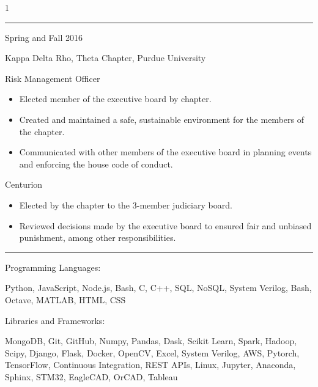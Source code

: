 \documentclass[10pt]{article}
\newlength{\cvcolumngapwidth}
\newlength{\cvleftcolumnwidth}
\newlength{\cvrightcolumnwidth}
\newcommand{\cvsectionstyle}[1]{{\normalsize\cvsectionfont\textcolor{cvsectioncolor}{#1}}}
\newcommand{\cvtitlestyle}[1]{{\large\cvtitlefont\textcolor{cvtitlecolor}{#1}}}
\newcommand{\cvdurationstyle}[1]{{\small\cvdurationfont\textcolor{cvdurationcolor}{#1}}}
\newcommand{\cvheadingstyle}[1]{{\normalsize\cvheadingfont\textcolor{cvheadingcolor}{#1}}}
\newlength{\cvafteritemskipamount}
\newlength{\cvaftersectionskipamount}
\newlength{\cvbetweensectionandheadingextraskipamount}
\newlength{\cvparskip}
\newcommand{\cvsection}[1]{
    \begin{minipage}[t]{\cvleftcolumnwidth}
        \raggedleft\cvsectionstyle{#1}
    \end{minipage}%
    \hspace{\cvcolumngapwidth}%
    \begin{minipage}[t]{\cvrightcolumnwidth}
        \textcolor{cvrulecolor}{\rule{\cvrightcolumnwidth}{0.3mm}}
    \end{minipage}

    \vspace{\cvaftersectionskipamount}
}
\newcommand{\cvitem}[2]{
    \begin{minipage}[t]{\cvleftcolumnwidth}
        \raggedleft #1
    \end{minipage}%
    \hspace{\cvcolumngapwidth}%
    \begin{minipage}[t]{\cvrightcolumnwidth}
        \setlength{\parskip}{\cvparskip} #2
    \end{minipage}

    \vspace{\cvafteritemskipamount}
}
\newcommand{\cvtitle}[1]{
    \cvtitlestyle{#1}

    \vspace{1mm plus 0.25mm minus 0.25mm}
    \vspace{-\cvparskip}
}
\def\cv{0}
\begin{document}
\if\cv1
    \cvsection{FRATERNITY LEADERSHIP}
    
    \cvitem{
        \cvdurationstyle{Spring and Fall 2016}
    }{
        \cvtitle{Kappa Delta Rho, Theta Chapter, Purdue University}
        
        Risk Management Officer
    
        \begin{itemize}[leftmargin=*]
            \item Elected member of the executive board by chapter.
            \item Created and maintained a safe, sustainable environment for the members of the chapter.
            \item Communicated with other members of the executive board in planning events and enforcing the house code of conduct. 
        \end{itemize}
        
        Centurion
    
        \begin{itemize}[leftmargin=*]
            \item Elected by the chapter to the 3-member judiciary board.
            \item Reviewed decisions made by the executive board to ensured fair and unbiased punishment, among other responsibilities.
        \end{itemize}
    }
\fi

\cvsection{SKILLS}

\vspace{\cvbetweensectionandheadingextraskipamount}
\cvitem{
    \cvheadingstyle{Programming Languages:}
}{
    Python, JavaScript, Node.js, Bash, C, C++, SQL, NoSQL, System Verilog, Bash, Octave, MATLAB, HTML, CSS
}
\cvitem{
    \cvheadingstyle{Libraries and Frameworks:}
}{
    MongoDB, Git, GitHub, Numpy, Pandas, Dask, Scikit Learn, Spark, Hadoop, Scipy, Django, Flask, Docker, OpenCV, Excel, System Verilog, AWS, Pytorch, TensorFlow, Continuous Integration, REST APIs, Linux, Jupyter, Anaconda, Sphinx, STM32, EagleCAD, OrCAD, Tableau
}
\end{document}
